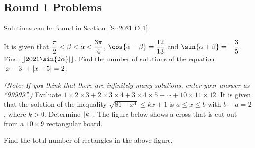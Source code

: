 \subsection{Round 1 Problems}

Solutions can be found in Section~\ref{S::2021-O-1}.

\begin{enumerate}
    \hyperrefitem[Q::2021-O-1-1] It is given that $\dfrac\pi2 < \beta < \alpha < \dfrac{3\pi}{4}$, $\cos{\a - \b} = \dfrac{12}{13}$ and $\sin{\a + \b} = -\dfrac35$. Find $\floor{\abs{2021\sin{2\a}}}$.
    \hyperrefitem[Q::2021-O-1-2] Find the number of solutions of the equation $\left\lvert x - 3 \right\rvert + \left\lvert x - 5 \right\rvert = 2$.

    \textit{(Note: If you think that there are infinitely many solutions, enter your answer as ``99999''.)}
    \hyperrefitem[Q::2021-O-1-3] Evaluate $1 \times 2 \times 3 + 2 \times 3 \times 4 + 3 \times 4 \times 5 + \cdots + 10 \times 11 \times 12$.
    \hyperrefitem[Q::2021-O-1-4] It is given that the solution of the inequality $\sqrt{81 - x^4} \leq kx + 1$ is $a \leq x \leq b$ with $b - a = 2$, where $k > 0$. Determine $\left\lfloor k \right\rfloor$.
    \hyperrefitem[Q::2021-O-1-5] The figure below shows a cross that is cut out from a $10 \times 9$ rectangular board.

    \begin{center}
    \end{center}
    
    Find the total number of rectangles in the above figure.


\end{enumerate}
